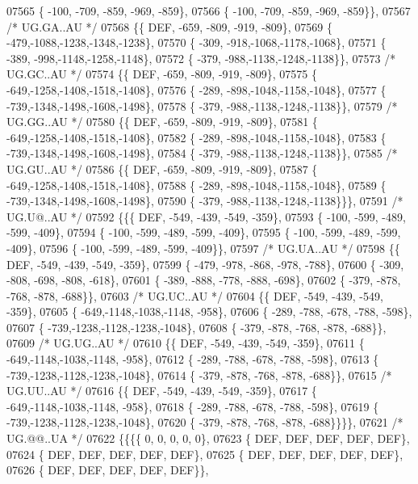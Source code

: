 \begin{DoxyCode}
07565 \{ -100, -709, -859, -969, -859\},
07566 \{ -100, -709, -859, -969, -859\}\},
07567 \textcolor{comment}{/* UG.GA..AU */}
07568 \{\{  DEF, -659, -809, -919, -809\},
07569 \{ -479,-1088,-1238,-1348,-1238\},
07570 \{ -309, -918,-1068,-1178,-1068\},
07571 \{ -389, -998,-1148,-1258,-1148\},
07572 \{ -379, -988,-1138,-1248,-1138\}\},
07573 \textcolor{comment}{/* UG.GC..AU */}
07574 \{\{  DEF, -659, -809, -919, -809\},
07575 \{ -649,-1258,-1408,-1518,-1408\},
07576 \{ -289, -898,-1048,-1158,-1048\},
07577 \{ -739,-1348,-1498,-1608,-1498\},
07578 \{ -379, -988,-1138,-1248,-1138\}\},
07579 \textcolor{comment}{/* UG.GG..AU */}
07580 \{\{  DEF, -659, -809, -919, -809\},
07581 \{ -649,-1258,-1408,-1518,-1408\},
07582 \{ -289, -898,-1048,-1158,-1048\},
07583 \{ -739,-1348,-1498,-1608,-1498\},
07584 \{ -379, -988,-1138,-1248,-1138\}\},
07585 \textcolor{comment}{/* UG.GU..AU */}
07586 \{\{  DEF, -659, -809, -919, -809\},
07587 \{ -649,-1258,-1408,-1518,-1408\},
07588 \{ -289, -898,-1048,-1158,-1048\},
07589 \{ -739,-1348,-1498,-1608,-1498\},
07590 \{ -379, -988,-1138,-1248,-1138\}\}\},
07591 \textcolor{comment}{/* UG.U@..AU */}
07592 \{\{\{  DEF, -549, -439, -549, -359\},
07593 \{ -100, -599, -489, -599, -409\},
07594 \{ -100, -599, -489, -599, -409\},
07595 \{ -100, -599, -489, -599, -409\},
07596 \{ -100, -599, -489, -599, -409\}\},
07597 \textcolor{comment}{/* UG.UA..AU */}
07598 \{\{  DEF, -549, -439, -549, -359\},
07599 \{ -479, -978, -868, -978, -788\},
07600 \{ -309, -808, -698, -808, -618\},
07601 \{ -389, -888, -778, -888, -698\},
07602 \{ -379, -878, -768, -878, -688\}\},
07603 \textcolor{comment}{/* UG.UC..AU */}
07604 \{\{  DEF, -549, -439, -549, -359\},
07605 \{ -649,-1148,-1038,-1148, -958\},
07606 \{ -289, -788, -678, -788, -598\},
07607 \{ -739,-1238,-1128,-1238,-1048\},
07608 \{ -379, -878, -768, -878, -688\}\},
07609 \textcolor{comment}{/* UG.UG..AU */}
07610 \{\{  DEF, -549, -439, -549, -359\},
07611 \{ -649,-1148,-1038,-1148, -958\},
07612 \{ -289, -788, -678, -788, -598\},
07613 \{ -739,-1238,-1128,-1238,-1048\},
07614 \{ -379, -878, -768, -878, -688\}\},
07615 \textcolor{comment}{/* UG.UU..AU */}
07616 \{\{  DEF, -549, -439, -549, -359\},
07617 \{ -649,-1148,-1038,-1148, -958\},
07618 \{ -289, -788, -678, -788, -598\},
07619 \{ -739,-1238,-1128,-1238,-1048\},
07620 \{ -379, -878, -768, -878, -688\}\}\}\},
07621 \textcolor{comment}{/* UG.@@..UA */}
07622 \{\{\{\{    0,    0,    0,    0,    0\},
07623 \{  DEF,  DEF,  DEF,  DEF,  DEF\},
07624 \{  DEF,  DEF,  DEF,  DEF,  DEF\},
07625 \{  DEF,  DEF,  DEF,  DEF,  DEF\},
07626 \{  DEF,  DEF,  DEF,  DEF,  DEF\}\},

\end{DoxyCode}
